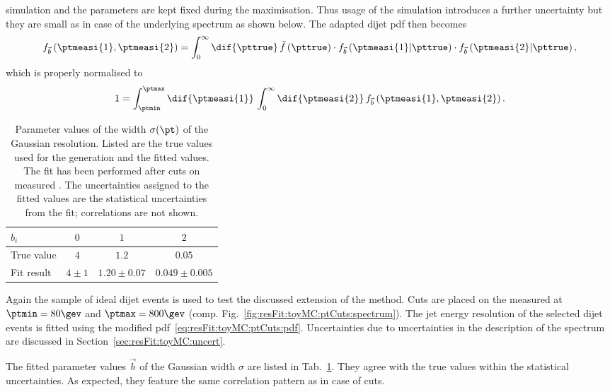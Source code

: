 \documentclass[a4paper]{cmspaper} %
\begin{document}
simulation and the parameters are kept fixed during the maximisation.
Thus usage of the simulation introduces a further uncertainty but they
are small as in case of the underlying spectrum as shown below.
The adapted dijet pdf then becomes
\begin{equation}
  \label{eq:resFit:toyMC:ptCuts:pdf}
  f_{\vec{b}}\left(\ptmeasi{1},\ptmeasi{2}\right) = \int^{\infty}_{0}\dif{\pttrue}\,\tilde{f}\left(\pttrue\right)
  \cdot f_{\vec{b}}\left(\ptmeasi{1}|\pttrue\right)
  \cdot f_{\vec{b}}\left(\ptmeasi{2}|\pttrue\right),
\end{equation}
which is properly normalised to
\begin{equation*}
  1 = \int^{\ptmax}_{\ptmin}\dif{\ptmeasi{1}}\,\int^{\infty}_{0}\dif{\ptmeasi{2}}\, f_{\vec{b}}\left(\ptmeasi{1},\ptmeasi{2}\right).
\end{equation*}

\begin{table}[ht]
  \centering
  \begin{tabular}[ht]{lccc}
    \hline \hline
    $b_{i}$ & $0$ & $1$ & $2$ \\
    \hline
    True value & $4$           & $1.2$                   & $0.05$ \\
    Fit result   & $4 \pm 1$ & $1.20 \pm 0.07$ & $0.049 \pm 0.005$ \\
    \hline \hline
  \end{tabular}
  \caption{Parameter values of the width $\sigma(\pt)$ of the Gaussian
    resolution. Listed are the true values used for the generation and
    the fitted values. The fit has been performed after cuts on measured \pt.
    The uncertainties assigned to the fitted values
    are the statistical uncertainties from the fit; correlations are not shown.}
  \label{tab:resFit:toyMC:ptCuts:fitResult}
\end{table}

Again the sample of ideal dijet events is used to test the discussed extension of the method.
Cuts are placed on the measured \pt at \mbox{$\ptmin = 80\gev$} and \mbox{$\ptmax = 800\gev$} (comp. Fig.~\ref{fig:resFit:toyMC:ptCuts:spectrum}).
The jet energy resolution of the selected dijet events is fitted using the modified pdf~\eqref{eq:resFit:toyMC:ptCuts:pdf}.
Uncertainties due to uncertainties in the description of the spectrum are discussed in Section~\ref{sec:resFit:toyMC:uncert}.

The fitted parameter values $\vec{b}$ of the Gaussian width $\sigma$ are listed in Tab.~\ref{tab:resFit:toyMC:ptCuts:fitResult}.
They agree with the true values within the statistical uncertainties.
As expected, they feature the same correlation pattern as in case of \pttrue cuts.
\end{document}

